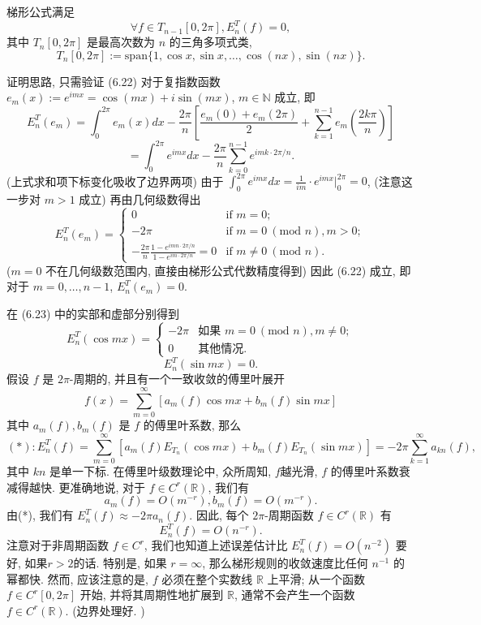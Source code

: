 \documentclass[a4paper]{ctexart}
\newcommand{\hl}[1]
{\noindent {\bf {#1}}}
\begin{document}
\hl{引理 6.21} 梯形公式满足
$$ 
\forall f \in T_{n-1}[0, 2\pi], E^T_n(f) = 0, 
$$
其中 $T_n[0, 2\pi]$ 是最高次数为 $n$ 的三角多项式类, 
$$ 
T_n[0, 2\pi] := \text{span}\{1, \cos x, \sin x, \ldots, \cos(nx), \sin(nx)\}. 
$$

证明思路, 只需验证 (6.22) 对于复指数函数 $e_m(x) := e^{imx} = \cos(mx) + i\sin(mx)$, 
$m \in \mathbb{N}$ 成立, 即
$$
E^T_n(e_m) = \int_{0}^{2\pi} e_m(x)dx 
- \frac{2\pi}{n} \left[ \frac{e_m(0) + e_m(2\pi)}{2} 
+ \sum_{k=1}^{n-1} e_m\left(\frac{2k\pi}{n}\right) \right]
$$
$$
= \int_{0}^{2\pi} e^{imx}dx - \frac{2\pi}{n} \sum_{k=0}^{n-1} e^{imk\cdot2\pi/n}.
$$
(上式求和项下标变化吸收了边界两项) 由于 
$\int_{0}^{2\pi} e^{imx}dx = \frac{1}{im} \cdot e^{imx} \bigg|_{0}^{2\pi} = 0$, 
(注意这一步对 $m > 1$ 成立) 再由几何级数得出
$$
E^T_n(e_m) =
\begin{cases}
0 & \text{if } m = 0; \\
-2\pi & \text{if } m = 0 \ (\text{mod } n), m > 0; \\
-\frac{2\pi}{n} \frac{1-e^{imn\cdot2\pi/n}}{1-e^{im\cdot2\pi/n}} = 0 & \text{if } m \neq 0 \ (\text{mod } n).
\end{cases}
$$
($m = 0$ 不在几何级数范围内, 直接由梯形公式代数精度得到)
因此 (6.22) 成立, 即对于 $m = 0, \ldots, n - 1$, $E^T_n(e_m) = 0$. 

在 (6.23) 中的实部和虚部分别得到
$$
E^T_n(\cos mx) =
\begin{cases}
-2\pi & \text{如果 } m = 0 \ (\text{mod } n), m \neq 0; \\
0 & \text{其他情况.}
\end{cases}
$$
$$
E^T_n(\sin mx) = 0.
$$
假设 $f$ 是 $2\pi$-周期的, 并且有一个一致收敛的傅里叶展开
$$
f(x) = \sum_{m=0}^{\infty} [a_m(f) \cos mx + b_m(f) \sin mx]
$$
其中 $a_m(f), b_m(f)$ 是 $f$ 的傅里叶系数, 那么
$$
(*) : 
E^T_n(f) = \sum_{m=0}^{\infty} 
[a_m(f)E_{T_n}(\cos mx) + b_m(f)E_{T_n}(\sin mx)] 
= -2\pi \sum_{k=1}^{\infty} a_{kn}(f),
$$
其中 $kn$ 是单一下标. 在傅里叶级数理论中, 众所周知, $f$越光滑, 
$f$ 的傅里叶系数衰减得越快. 更准确地说, 对于 $f \in C^r(\mathbb{R})$, 
我们有
$$
a_m(f) = O(m^{-r}), b_m(f) = O(m^{-r}).
$$
由(*), 我们有 $E^T_n(f) \approx -2\pi a_n(f)$. 
因此, 每个 $2\pi$-周期函数 $f \in C^r(\mathbb{R})$ 有
$$
E^T_n(f) = O(n^{-r}).
$$
注意对于非周期函数 $f \in C^r$, 我们也知道上述误差估计比 $E^T_n(f) = O(n^{-2})$ 要好, 
如果$r > 2$的话. 特别是, 如果 $r = \infty$, 那么梯形规则的收敛速度比任何 
$n^{-1}$ 的幂都快. 然而, 应该注意的是, $f$ 必须在整个实数线 $\mathbb{R}$ 上平滑;
从一个函数 $f \in C^r[0, 2\pi]$ 开始, 并将其周期性地扩展到 $\mathbb{R}$, 
通常不会产生一个函数 $f \in C^r(\mathbb{R})$. (边界处理好. )
\end{document}
